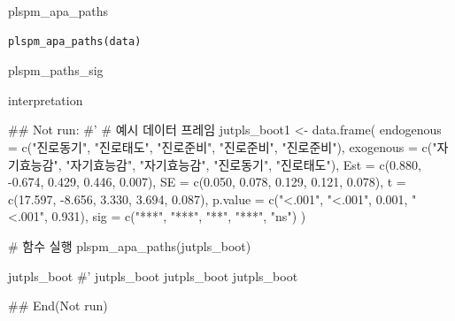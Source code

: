 \documentclass[a4paper]{book}
\begin{document}
%
\begin{Description}
plspm\_apa\_paths
\end{Description}
%
\begin{Usage}
\begin{verbatim}
plspm_apa_paths(data)
\end{verbatim}
\end{Usage}
%
\begin{Arguments}
\begin{ldescription}
\item[\code{data}] plspm\_paths\_sig
\end{ldescription}
\end{Arguments}
%
\begin{Value}
interpretation
\end{Value}
%
\begin{Examples}
\begin{ExampleCode}

\#\# Not run: 
#'
# 예시 데이터 프레임
jutpls_boot1 <- data.frame(
  endogenous = c("진로동기", "진로태도", "진로준비", "진로준비", "진로준비"),
  exogenous = c("자기효능감", "자기효능감", "자기효능감", "진로동기", "진로태도"),
  Est = c(0.880, -0.674, 0.429, 0.446, 0.007),
  SE = c(0.050, 0.078, 0.129, 0.121, 0.078),
  t = c(17.597, -8.656, 3.330, 3.694, 0.087),
  p.value = c("<.001", "<.001", 0.001, "<.001", 0.931),
  sig = c("***", "***", "**", "***", "ns")
)

# 함수 실행
plspm_apa_paths(jutpls_boot)

jutpls_boot %
#'
jutpls_boot %
jutpls_boot %
jutpls_boot %



## End(Not run)

\end{ExampleCode}
\end{Examples}
\end{document}
